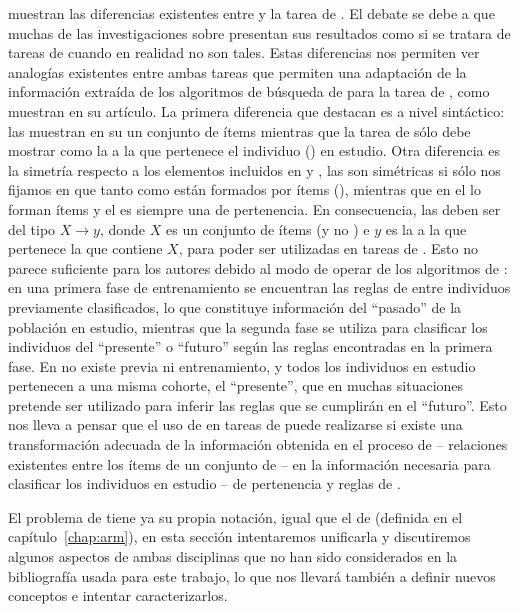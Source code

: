 \citet{Freitas-UnderstandingDiffBetweenClassifAndDiscoveryOfAR-2000} muestran las diferencias existentes entre \ARM y la tarea de \clasificacion. El debate se debe a que muchas de las investigaciones sobre \ARM presentan sus resultados como si se tratara de tareas de \clasificacion cuando en realidad no son tales. Estas diferencias nos permiten ver analogías existentes entre ambas tareas que permiten una adaptación de la información extraída de los algoritmos de búsqueda de \ars para la tarea de \clasificacion, como muestran \citet{LiuHsuMa-IntegratingClassificationAndARM-1998} en su artículo. La primera diferencia que destacan es a nivel sintáctico: las \ars muestran en su \consecuente un conjunto de ítems mientras que la tarea de \clasificacion sólo debe mostrar como \consecuente la \clase a la que pertenece el individuo (\transaccion) en estudio. Otra diferencia es la simetría respecto a los elementos incluidos en \antecedente y \consecuente, las \ars son simétricas si sólo nos fijamos en que tanto \antecedente como \consecuente están formados por ítems (\atributos), mientras que en \clasificacion el \antecedente lo forman ítems y el \consecuente es siempre una \clase de pertenencia. En consecuencia, las \ars deben ser del tipo $X\rightarrow y$, donde $X$ es un conjunto de ítems (\atributos y no \clases) e $y$ es la \clase a la que pertenece la \transaccion que contiene $X$, para poder ser utilizadas en tareas de \clasificacion. Esto no parece suficiente para los autores debido al modo de operar de los algoritmos de \clasificacion: en una primera fase de entrenamiento se encuentran las reglas de \clasificacion entre individuos previamente clasificados, lo que constituye información del "`pasado"' de la población en estudio, mientras que la segunda fase se utiliza para clasificar los individuos del "`presente"' o "`futuro"' según las reglas encontradas en la primera fase. En \ARM no existe \clasificacion previa ni entrenamiento, y todos los individuos en estudio pertenecen a una misma cohorte, el "`presente"', que en muchas situaciones pretende ser utilizado para inferir las reglas que se cumplirán en el "`futuro"'. Esto nos lleva a pensar que el uso de \ars en tareas de \clasificacion puede realizarse si existe una transformación adecuada de la información obtenida en el proceso de \ARM -- relaciones existentes entre los ítems de un conjunto de \transacciones -- en la información necesaria para clasificar los individuos en estudio -- \clases de pertenencia y reglas de \clasificacion.


El problema de \Clasificacion tiene ya su propia notación, igual que el de \arm (definida en el capítulo~\ref{chap:arm}), en esta sección intentaremos unificarla y discutiremos algunos aspectos de ambas disciplinas que no han sido considerados en la bibliografía usada para este trabajo, lo que nos llevará también a definir nuevos conceptos e intentar caracterizarlos.


